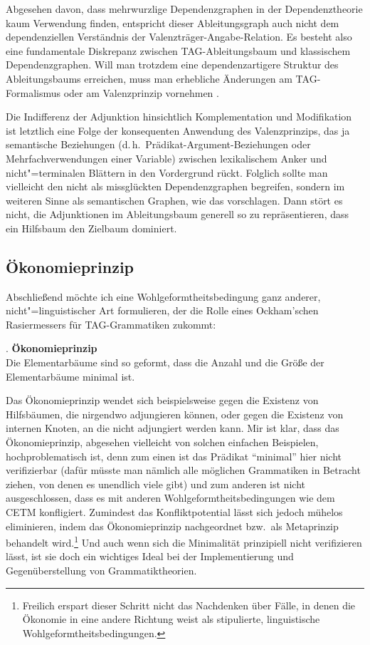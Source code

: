 Abgesehen davon, dass mehrwurzlige Dependenzgraphen in der Dependenztheorie kaum Verwendung finden, entspricht dieser Ableitungsgraph auch nicht dem dependenziellen Verständnis der Valenzträger-Angabe-Relation. Es besteht also eine fundamentale Diskrepanz zwischen TAG-Ableitungsbaum und klassischem Dependenzgraphen. Will man trotzdem eine dependenzartigere Struktur des Ableitungsbaums erreichen, muss man erhebliche Änderungen am TAG-Formalismus oder am Valenzprinzip vornehmen \citep{Rambow:etal:95,Schabes:Shieber:94}.            

Die Indifferenz der Adjunktion hinsichtlich Komplementation und Modifikation ist letztlich eine Folge der konsequenten Anwendung des Valenzprinzips, das ja semantische Beziehungen (d.\,h.\ Prädikat-Argument-Beziehungen oder Mehrfachverwendungen einer Variable) zwischen lexikalischem Anker und nicht"=terminalen Blättern in den Vordergrund rückt. Folglich sollte man vielleicht den  nicht als missglückten Dependenzgraphen begreifen, sondern  im weiteren Sinne als semantischen Graphen, wie das \cite{Candito:Kahane:98} vorschlagen. Dann stört es nicht, die Adjunktionen im Ableitungsbaum generell so zu repräsentieren, dass ein Hilfsbaum den Zielbaum dominiert.


\subsection{Ökonomieprinzip}

Abschlie\ss end möchte ich eine Wohlgeformtheitsbedingung ganz anderer, nicht"=linguistischer Art formulieren, der die Rolle eines Ockham'schen Rasiermessers für TAG-Grammatiken zukommt: 

\ex. {\bf Ökonomieprinzip}\label{ex-oekonomieprinzip-tag} \\
Die Elementarbäume sind so geformt, dass die Anzahl und die Grö\ss e der Elementarbäume minimal ist.     

Das Ökonomieprinzip wendet sich beispielsweise gegen die Existenz von Hilfsbäumen, die nirgendwo adjungieren können, oder gegen die Existenz von internen Knoten, an die nicht adjungiert werden kann. Mir ist klar, dass das Ökonomieprinzip, abgesehen vielleicht von solchen einfachen Beispielen, hochproblematisch ist, denn zum einen ist das Prädikat "`minimal"' hier nicht verifizierbar (dafür müsste man nämlich alle möglichen Grammatiken in Betracht ziehen, von denen es unendlich viele gibt) und zum anderen ist nicht ausgeschlossen, dass es mit anderen Wohlgeformtheitsbedingungen wie dem CETM konfligiert. Zumindest das Konfliktpotential lässt sich jedoch mühelos eliminieren, indem das Ökonomieprinzip nachgeordnet bzw.\ als Metaprinzip behandelt wird.\footnote{Freilich erspart dieser Schritt nicht das Nachdenken über Fälle, in denen die Ökonomie in eine andere Richtung weist als stipulierte, linguistische Wohlgeformtheitsbedingungen.} Und auch wenn sich die Minimalität prinzipiell nicht verifizieren lässt, ist sie doch ein wichtiges Ideal bei der Implementierung und Gegenüberstellung von Grammatiktheorien.     


